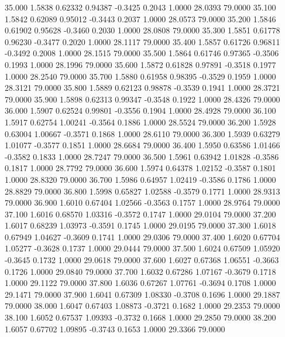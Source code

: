   35.000   1.5838   0.62332   0.94387  -0.3425   0.2043   1.0000  28.0393  79.0000
  35.100   1.5842   0.62089   0.95012  -0.3443   0.2037   1.0000  28.0573  79.0000
  35.200   1.5846   0.61902   0.95628  -0.3460   0.2030   1.0000  28.0808  79.0000
  35.300   1.5851   0.61778   0.96230  -0.3477   0.2020   1.0000  28.1117  79.0000
  35.400   1.5857   0.61726   0.96811  -0.3492   0.2008   1.0000  28.1515  79.0000
  35.500   1.5864   0.61746   0.97365  -0.3506   0.1993   1.0000  28.1996  79.0000
  35.600   1.5872   0.61828   0.97891  -0.3518   0.1977   1.0000  28.2540  79.0000
  35.700   1.5880   0.61958   0.98395  -0.3529   0.1959   1.0000  28.3121  79.0000
  35.800   1.5889   0.62123   0.98878  -0.3539   0.1941   1.0000  28.3721  79.0000
  35.900   1.5898   0.62313   0.99347  -0.3548   0.1922   1.0000  28.4326  79.0000
  36.000   1.5907   0.62524   0.99801  -0.3556   0.1904   1.0000  28.4928  79.0000
  36.100   1.5917   0.62754   1.00241  -0.3564   0.1886   1.0000  28.5524  79.0000
  36.200   1.5928   0.63004   1.00667  -0.3571   0.1868   1.0000  28.6110  79.0000
  36.300   1.5939   0.63279   1.01077  -0.3577   0.1851   1.0000  28.6684  79.0000
  36.400   1.5950   0.63586   1.01466  -0.3582   0.1833   1.0000  28.7247  79.0000
  36.500   1.5961   0.63942   1.01828  -0.3586   0.1817   1.0000  28.7792  79.0000
  36.600   1.5974   0.64378   1.02152  -0.3587   0.1801   1.0000  28.8320  79.0000
  36.700   1.5986   0.64957   1.02419  -0.3586   0.1786   1.0000  28.8829  79.0000
  36.800   1.5998   0.65827   1.02588  -0.3579   0.1771   1.0000  28.9313  79.0000
  36.900   1.6010   0.67404   1.02566  -0.3563   0.1757   1.0000  28.9764  79.0000
  37.100   1.6016   0.68570   1.03316  -0.3572   0.1747   1.0000  29.0104  79.0000
  37.200   1.6017   0.68239   1.03973  -0.3591   0.1745   1.0000  29.0195  79.0000
  37.300   1.6018   0.67949   1.04627  -0.3609   0.1741   1.0000  29.0306  79.0000
  37.400   1.6020   0.67704   1.05277  -0.3628   0.1737   1.0000  29.0444  79.0000
  37.500   1.6024   0.67509   1.05920  -0.3645   0.1732   1.0000  29.0618  79.0000
  37.600   1.6027   0.67368   1.06551  -0.3663   0.1726   1.0000  29.0840  79.0000
  37.700   1.6032   0.67286   1.07167  -0.3679   0.1718   1.0000  29.1122  79.0000
  37.800   1.6036   0.67267   1.07761  -0.3694   0.1708   1.0000  29.1471  79.0000
  37.900   1.6041   0.67309   1.08330  -0.3708   0.1696   1.0000  29.1887  79.0000
  38.000   1.6047   0.67403   1.08873  -0.3721   0.1682   1.0000  29.2353  79.0000
  38.100   1.6052   0.67537   1.09393  -0.3732   0.1668   1.0000  29.2850  79.0000
  38.200   1.6057   0.67702   1.09895  -0.3743   0.1653   1.0000  29.3366  79.0000
